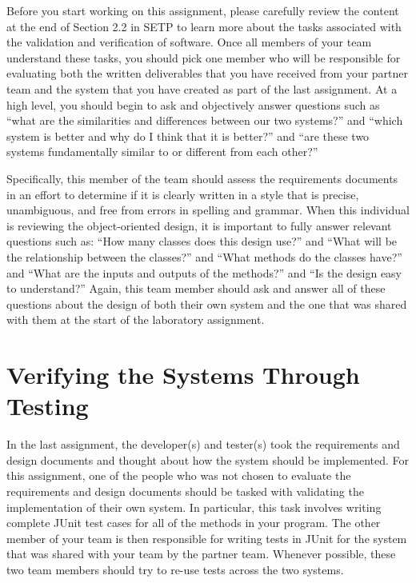 Before you start working on this assignment, please carefully review the content at the end of Section 2.2 in SETP to
learn more about the tasks associated with the validation and verification of software. Once all members of your team
understand these tasks, you should pick one member who will be responsible for evaluating both the written deliverables
that you have received from your partner team and the system that you have created as part of the last assignment. At a
high level, you should begin to ask and objectively answer questions such as ``what are the similarities and differences
between our two systems?'' and ``which system is better and why do I think that it is better?'' and ``are these two
systems fundamentally similar to or different from each other?''

Specifically, this member of the team should assess the requirements documents in an effort to determine if it is
clearly written in a style that is precise, unambiguous, and free from errors in spelling and grammar. When this
individual is reviewing the object-oriented design, it is important to fully answer relevant questions such as: ``How
many classes does this design use?'' and ``What will be the relationship between the classes?'' and ``What methods do
the classes have?'' and ``What are the inputs and outputs of the methods?'' and ``Is the design easy to understand?''
Again, this team member should ask and answer all of these questions about the design of both their own system and the
one that was shared with them at the start of the laboratory assignment.

\section*{Verifying the Systems Through Testing}

In the last assignment, the developer(s) and tester(s) took the requirements and design documents and thought about how
the system should be implemented. For this assignment, one of the people who was not chosen to evaluate the requirements
and design documents should be tasked with validating the implementation of their own system. In particular, this task
involves writing complete JUnit test cases for all of the methods in your program. The other member of your team is
then responsible for writing tests in JUnit for the system that was shared with your team by the partner team. Whenever
possible, these two team members should try to re-use tests across the two systems.

